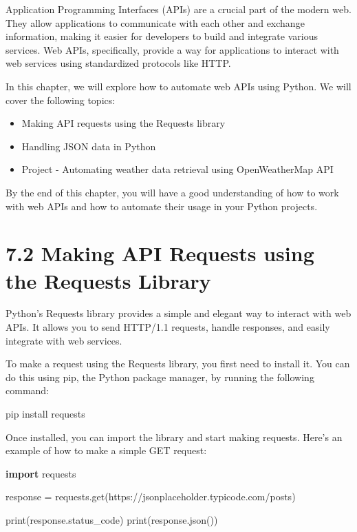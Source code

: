 \documentclass[
  paper=a4,
  ,captions=tableheading
]{scrartcl}
\newenvironment{Shaded}{}{}
\newcommand{\BuiltInTok}[1]{\textcolor[rgb]{0.00,0.50,0.00}{#1}}
\newcommand{\ExtensionTok}[1]{#1}
\newcommand{\ImportTok}[1]{\textcolor[rgb]{0.00,0.50,0.00}{\textbf{#1}}}
\newcommand{\NormalTok}[1]{#1}
\newcommand{\OperatorTok}[1]{\textcolor[rgb]{0.40,0.40,0.40}{#1}}
\newcommand{\StringTok}[1]{\textcolor[rgb]{0.25,0.44,0.63}{#1}}
\providecommand{\tightlist}{%
  \setlength{\itemsep}{0pt}\setlength{\parskip}{0pt}}
\begin{document}
Application Programming Interfaces (APIs) are a crucial part of the
modern web. They allow applications to communicate with each other and
exchange information, making it easier for developers to build and
integrate various services. Web APIs, specifically, provide a way for
applications to interact with web services using standardized protocols
like HTTP.

In this chapter, we will explore how to automate web APIs using Python.
We will cover the following topics:

\begin{itemize}
\tightlist
\item
  Making API requests using the Requests library
\item
  Handling JSON data in Python
\item
  Project - Automating weather data retrieval using OpenWeatherMap API
\end{itemize}

By the end of this chapter, you will have a good understanding of how to
work with web APIs and how to automate their usage in your Python
projects.

\hypertarget{making-api-requests-using-the-requests-library}{%
\section{7.2 Making API Requests using the Requests
Library}\label{making-api-requests-using-the-requests-library}}

Python's Requests library provides a simple and elegant way to interact
with web APIs. It allows you to send HTTP/1.1 requests, handle
responses, and easily integrate with web services.

To make a request using the Requests library, you first need to install
it. You can do this using pip, the Python package manager, by running
the following command:

\begin{Shaded}
\begin{Highlighting}[]
\ExtensionTok{pip}\NormalTok{ install requests}
\end{Highlighting}
\end{Shaded}

Once installed, you can import the library and start making requests.
Here's an example of how to make a simple GET request:

\begin{Shaded}
\begin{Highlighting}[]
\ImportTok{import}\NormalTok{ requests}

\NormalTok{response }\OperatorTok{=}\NormalTok{ requests.get(}\StringTok{\textquotesingle{}https://jsonplaceholder.typicode.com/posts\textquotesingle{}}\NormalTok{)}

\BuiltInTok{print}\NormalTok{(response.status\_code)}
\BuiltInTok{print}\NormalTok{(response.json())}
\end{Highlighting}
\end{Shaded}
\end{document}
